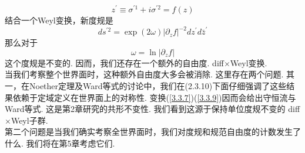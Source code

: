 \begin{equation}\label{3.3.7}
z^{\prime} \equiv \sigma^{\prime 1}+i \sigma^{\prime 2}=f(z)
\end{equation}
结合一个Weyl变换，新度规是
\begin{equation}
d s^{\prime 2}=\exp (2 \omega)\left|\partial_{z} f\right|^{-2} d z^{\prime} d \bar{z}^{\prime}
\end{equation}
那么对于
\begin{equation}\label{3.3.9}
\omega=\ln \left|\partial_{z} f\right|
\end{equation}
这个度规是不变的. 因而，我们还存在一个额外的自由度. diff$\times$Weyl变换.\\
当我们考察整个世界面时，这种额外自由度大多会被消除. 这里存在两个问题. 其一，在Noether定理及Ward等式的讨论中，我们在(2.3.10)下面仔细强调了这些结果依赖于定域定义在世界面上的对称性. 变换(\ref{3.3.7})(\ref{3.3.9})因而会给出守恒流与Ward等式. 这是第2章研究的共形不变性. 我们看到这源于保持单位度规不变的 diff$\times$Weyl子群.\\
第二个问题是当我们确实考察全世界面时，我们对度规和规范自由度的计数发生了什么. 我们将在第5章考虑它们.\\

